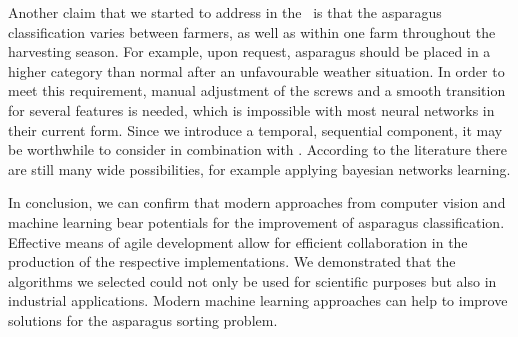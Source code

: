 Another claim that we started to address in the~
is that the asparagus classification varies between farmers, as well as within one farm throughout the harvesting season. For example, upon request, asparagus should be placed in a higher category than normal after an unfavourable weather situation. In order to meet this requirement, manual adjustment of the screws and a smooth transition for several features is needed, which is impossible with most neural networks in their current form. Since we introduce a temporal, sequential component, it may be worthwhile to consider  in combination with  . According to the literature there are still many wide possibilities, for example applying bayesian networks learning.

\bigskip
In conclusion, we can confirm that modern approaches from computer vision and machine learning bear potentials for the improvement of asparagus classification. Effective means of agile development allow for efficient collaboration in the production of the respective implementations. We demonstrated that the algorithms we selected could not only be used for scientific purposes but also in industrial applications. Modern machine learning approaches can help to improve solutions for the asparagus sorting problem.